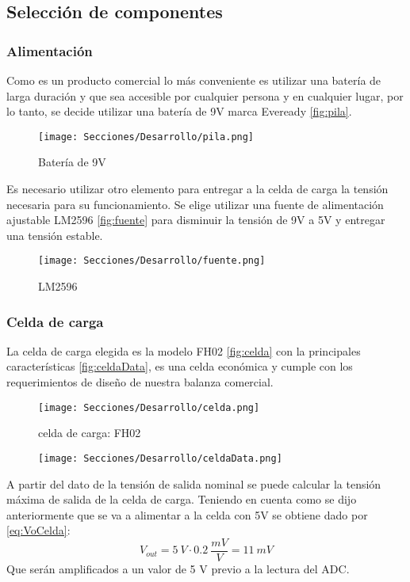 \subsection{Selección de componentes}
\subsubsection{Alimentación}
Como es un producto comercial lo más conveniente es utilizar una batería de larga duración y
que sea accesible por cualquier persona y en cualquier lugar, por lo tanto, se decide utilizar
una batería de 9V marca Eveready \autoref{fig:pila}.
\begin{figure}[H]
    \centering
    \texttt{[image: Secciones/Desarrollo/pila.png]}
    \caption{Batería de 9V}
    \label{fig:pila}
\end{figure}

Es necesario utilizar otro elemento para entregar a la celda de carga la tensión necesaria para su funcionamiento.
Se elige utilizar una fuente de alimentación ajustable LM2596 \autoref{fig:fuente} para disminuir la tensión de 9V a 5V y entregar una tensión estable.
\begin{figure}[H]
    \centering
    \texttt{[image: Secciones/Desarrollo/fuente.png]}
    \caption{LM2596}
    \label{fig:fuente}
\end{figure}

\subsubsection{Celda de carga}
La celda de carga elegida es la modelo FH02 \autoref{fig:celda} con la principales características \autoref{fig:celdaData}, es una celda económica y cumple con los
requerimientos de diseño de nuestra balanza comercial.
\begin{figure}[H]
    \centering
    \texttt{[image: Secciones/Desarrollo/celda.png]}
    \caption{celda de carga:  FH02}
    \label{fig:celda}
\end{figure}
\begin{figure}[H]
    \centering
    \texttt{[image: Secciones/Desarrollo/celdaData.png]}
    \caption{}
    \label{fig:celdaData}
\end{figure}
A partir del dato de la tensión de salida nominal se puede calcular la tensión máxima de salida de la celda de carga. Teniendo en cuenta como se dijo anteriormente que se va a alimentar a la celda con 5V se obtiene dado por \autoref{eq:VoCelda}:
\begin{equation*}
    V_{out} = 5~V \cdot 0.2~\frac{mV}{V} = 11~mV
\end{equation*}
Que serán amplificados a un valor de 5 V previo a la lectura del ADC.
